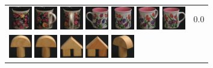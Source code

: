 {\begin{figure}[p]
\begin{tabular}{m{11cm} | m{3cm} |}
\includegraphics[width=1cm]{coil/beeld-62.eps}
\includegraphics[width=1cm]{coil/beeld-64.eps}
\includegraphics[width=1cm]{coil/beeld-65.eps}
\includegraphics[width=1cm]{coil/beeld-7.eps}
\includegraphics[width=1cm]{coil/beeld-8.eps}
\includegraphics[width=1cm]{coil/beeld-9.eps}
\includegraphics[width=1cm]{coil/beeld-6.eps}
& {\scriptsize 0.0}
\\
\includegraphics[width=1cm]{coil/beeld-0.eps}
\includegraphics[width=1cm]{coil/beeld-1.eps}
\includegraphics[width=1cm]{coil/beeld-42.eps}
\includegraphics[width=1cm]{coil/beeld-43.eps}
\includegraphics[width=1cm]{coil/beeld-4.eps}

\end{tabular}
\end{figure}}
